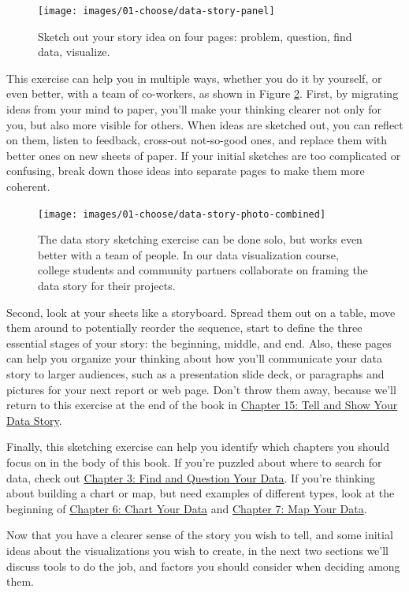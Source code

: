 \documentclass[
  english,
]{book}
\begin{document}
\begin{figure}
\texttt{[image: images/01-choose/data-story-panel]} \caption{Sketch out your story idea on four pages: problem, question, find data, visualize.}\label{fig:data-story-panel}
\end{figure}

This exercise can help you in multiple ways, whether you do it by yourself, or even better, with a team of co-workers, as shown in Figure \ref{fig:data-story-photo-combined}. First, by migrating ideas from your mind to paper, you'll make your thinking clearer not only for you, but also more visible for others. When ideas are sketched out, you can reflect on them, listen to feedback, cross-out not-so-good ones, and replace them with better ones on new sheets of paper. If your initial sketches are too complicated or confusing, break down those ideas into separate pages to make them more coherent.



\begin{figure}
\texttt{[image: images/01-choose/data-story-photo-combined]} \caption{The data story sketching exercise can be done solo, but works even better with a team of people. In our data visualization course, college students and community partners collaborate on framing the data story for their projects.}\label{fig:data-story-photo-combined}
\end{figure}

Second, look at your sheets like a storyboard. Spread them out on a table, move them around to potentially reorder the sequence, start to define the three essential stages of your story: the beginning, middle, and end. Also, these pages can help you organize your thinking about how you'll communicate your data story to larger audiences, such as a presentation slide deck, or paragraphs and pictures for your next report or web page. Don't throw them away, because we'll return to this exercise at the end of the book in \href{story.html}{Chapter 15: Tell and Show Your Data Story}.

Finally, this sketching exercise can help you identify which chapters you should focus on in the body of this book. If you're puzzled about where to search for data, check out \href{find.html}{Chapter 3: Find and Question Your Data}. If you're thinking about building a chart or map, but need examples of different types, look at the beginning of \href{chart.html}{Chapter 6: Chart Your Data} and \href{map.html}{Chapter 7: Map Your Data}.

Now that you have a clearer sense of the story you wish to tell, and some initial ideas about the visualizations you wish to create, in the next two sections we'll discuss tools to do the job, and factors you should consider when deciding among them.
\end{document}
